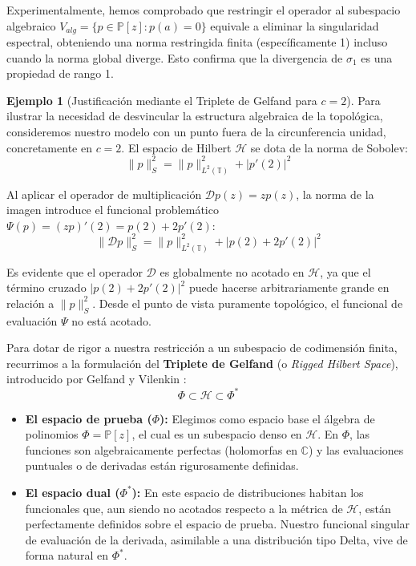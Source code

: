 \documentclass[12pt,a4paper]{article}
\theoremstyle{definition}
\newtheorem{ejemplo}{Ejemplo}
\theoremstyle{remark}
\newcommand{\Poly}{\mathbb{P}[z]}
\begin{document}
Experimentalmente, hemos comprobado que restringir el operador al subespacio algebraico $V_{alg} = \{p \in \Poly : p(a)=0\}$ equivale a eliminar la singularidad espectral, obteniendo una norma restringida finita (específicamente 1) incluso cuando la norma global diverge. Esto confirma que la divergencia de $\sigma_1$ es una propiedad de rango 1.

\begin{ejemplo}[Justificación mediante el Triplete de Gelfand para $c=2$]
    Para ilustrar la necesidad de desvincular la estructura algebraica de la topológica, consideremos nuestro modelo con un punto fuera de la circunferencia unidad, concretamente en $c=2$. El espacio de Hilbert $\mathcal{H}$ se dota de la norma de Sobolev:
    \[ \|p\|_S^2 = \|p\|_{L^2(\mathbb{T})}^2 + |p'(2)|^2 \]

    Al aplicar el operador de multiplicación $\mathcal{D}p(z) = zp(z)$, la norma de la imagen introduce el funcional problemático $\Psi(p) = (zp)'(2) = p(2) + 2p'(2)$:
    \[ \|\mathcal{D}p\|_S^2 = \|p\|_{L^2(\mathbb{T})}^2 + |p(2) + 2p'(2)|^2 \]

    Es evidente que el operador $\mathcal{D}$ es globalmente no acotado en $\mathcal{H}$, ya que el término cruzado $|p(2) + 2p'(2)|^2$ puede hacerse arbitrariamente grande en relación a $\|p\|_S^2$. Desde el punto de vista puramente topológico, el funcional de evaluación $\Psi$ no está acotado.

    Para dotar de rigor a nuestra restricción a un subespacio de codimensión finita, recurrimos a la formulación del \textbf{Triplete de Gelfand} (o \textit{Rigged Hilbert Space}), introducido por Gelfand y Vilenkin \cite{gelfand1964generalized}:
    \[ \Phi \subset \mathcal{H} \subset \Phi^* \]
    \begin{itemize}
        \item \textbf{El espacio de prueba ($\Phi$):} Elegimos como espacio base el álgebra de polinomios $\Phi = \mathbb{P}[z]$, el cual es un subespacio denso en $\mathcal{H}$. En $\Phi$, las funciones son algebraicamente perfectas (holomorfas en $\mathbb{C}$) y las evaluaciones puntuales o de derivadas están rigurosamente definidas.
        \item \textbf{El espacio dual ($\Phi^*$):} En este espacio de distribuciones habitan los funcionales que, aun siendo no acotados respecto a la métrica de $\mathcal{H}$, están perfectamente definidos sobre el espacio de prueba. Nuestro funcional singular de evaluación de la derivada, asimilable a una distribución tipo Delta, vive de forma natural en $\Phi^*$.
    \end{itemize}


\end{ejemplo}
\end{document}
